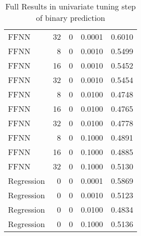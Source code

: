 \begin{table}[h!]
\begin{adjustbox}{max width=\textwidth}
\begin{tabular}{lrrrr}
  FFNN &    32 &     0 & 0.0001 & 0.6010 \\ 
  FFNN &     8 &     0 & 0.0010 & 0.5499 \\ 
  FFNN &    16 &     0 & 0.0010 & 0.5452 \\ 
  FFNN &    32 &     0 & 0.0010 & 0.5454 \\ 
  FFNN &     8 &     0 & 0.0100 & 0.4748 \\ 
  FFNN &    16 &     0 & 0.0100 & 0.4765 \\ 
  FFNN &    32 &     0 & 0.0100 & 0.4778 \\ 
  FFNN &     8 &     0 & 0.1000 & 0.4891 \\ 
  FFNN &    16 &     0 & 0.1000 & 0.4885 \\ 
  FFNN &    32 &     0 & 0.1000 & 0.5130 \\ 
  Regression &     0 &     0 & 0.0001 & 0.5869 \\ 
  Regression &     0 &     0 & 0.0010 & 0.5123 \\ 
  Regression &     0 &     0 & 0.0100 & 0.4834 \\ 
  Regression &     0 &     0 & 0.1000 & 0.5136 \\ 
   \hline
 \end{tabular}
\end{adjustbox}
\caption{Full Results in univariate tuning step of binary prediction} 
\label{tab:binary.par.tuning.full}
\end{table}

